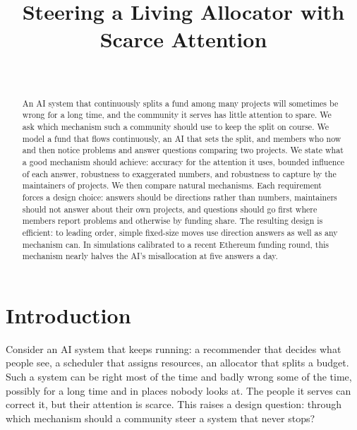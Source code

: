 \documentclass[doubleblind]{ecai}
\theoremstyle{remark}
\begin{document}
\begin{frontmatter}

\title{Steering a Living Allocator with Scarce Attention}

\author[A]{~}
\address[A]{Ben-Gurion University of the Negev}

\begin{abstract}
An AI system that continuously splits a fund among many projects will sometimes be wrong for a long time, and the community it serves has little attention to spare. We ask which mechanism such a community should use to keep the split on course. We model a fund that flows continuously, an AI that sets the split, and members who now and then notice problems and answer questions comparing two projects. We state what a good mechanism should achieve: accuracy for the attention it uses, bounded influence of each answer, robustness to exaggerated numbers, and robustness to capture by the maintainers of projects. We then compare natural mechanisms. Each requirement forces a design choice: answers should be directions rather than numbers, maintainers should not answer about their own projects, and questions should go first where members report problems and otherwise by funding share. The resulting design is efficient: to leading order, simple fixed-size moves use direction answers as well as any mechanism can. In simulations calibrated to a recent Ethereum funding round, this mechanism nearly halves the AI's misallocation at five answers a day.
\end{abstract}

\end{frontmatter}

\section{Introduction}

Consider an AI system that keeps running: a recommender that decides what people see, a scheduler that assigns resources, an allocator that splits a budget. Such a system can be right most of the time and badly wrong some of the time, possibly for a long time and in places nobody looks at. The people it serves can correct it, but their attention is scarce. This raises a design question: through which mechanism should a community steer a system that never stops?
\end{document}
